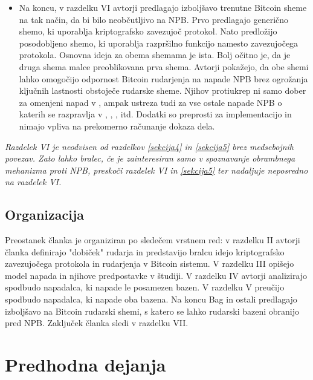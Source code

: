 \documentclass{acm_proc_article-sp}
\begin{document}
\begin{itemize}
	\item Na koncu, v razdelku VI avtorji predlagajo izboljšavo trenutne Bitcoin sheme na tak način, da bi bilo neobčutljivo na NPB. Prvo predlagajo generično shemo, ki uporablja kriptografsko zavezujoč protokol. Nato predložijo posodobljeno shemo, ki uporablja razpršilno funkcijo namesto zavezujočega protokola. Osnovna ideja za obema shemama je ista. Bolj očitno je, da je druga shema malce preoblikovana prva shema. Avtorji pokažejo, da obe shemi lahko omogočijo odpornost Bitcoin rudarjenja na napade NPB brez ogrožanja ključnih lastnosti obstoječe rudarske sheme. Njihov protiukrep ni samo dober za omenjeni napad v  \cite{originalarticle}, ampak ustreza tudi za vse ostale napade NPB o katerih se razpravlja v \cite{analysisofbitcoin}, \cite{minnersdilemma}, \cite{subversivestrategies}, itd. Dodatki so preprosti za implementacijo in nimajo vpliva na prekomerno računanje dokaza dela.
\end{itemize}

\textit{
	Razdelek VI je neodvisen od razdelkov \ref{sekcija4} in \ref{sekcija5} brez medsebojnih povezav. Zato lahko bralec, če je zainteresiran samo v spoznavanje obrambnega mehanizma proti NPB, preskoči razdelek VI in  \ref{sekcija5} ter nadaljuje neposredno na razdelek VI. }

\subsection{Organizacija}\label{sekcija1c}

Preostanek članka  \cite{originalarticle} je organiziran po sledečem vrstnem red: v razdelku II avtorji članka definirajo "dobiček" rudarja in predstavijo bralcu idejo kriptografsko zavezujočega protokola in rudarjenja v Bitcoin sistemu. V razdelku III opišejo model napada in njihove predpostavke v študiji. V razdelku IV avtorji analizirajo spodbudo napadalca, ki napade le posamezen bazen. V razdelku V preučijo spodbudo napadalca, ki napade oba bazena. Na koncu Bag  \cite{originalarticle} in ostali predlagajo izboljšavo na Bitcoin rudarski shemi, s katero se lahko rudarski bazeni obranijo pred NPB. Zaključek članka sledi v razdelku VII.

\section{Predhodna dejanja}\label{sekcija2}
\end{document}

